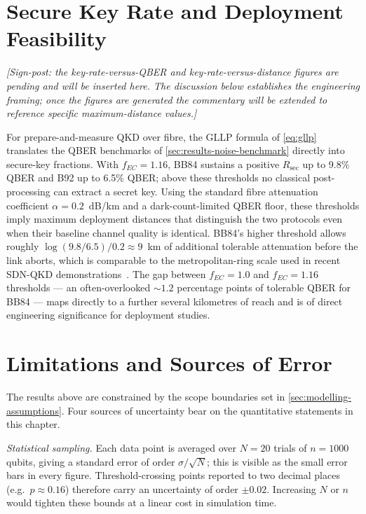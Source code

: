 \documentclass[10pt, a4paper]{report}
\newcommand{\keyrate}{\ensuremath{R_{\mathrm{sec}}}}
\begin{document}
\section{Secure Key Rate and Deployment Feasibility}
\label{sec:results-keyrate}

\textit{[Sign-post: the key-rate-versus-QBER and key-rate-versus-distance figures are pending and will be inserted here. The discussion below establishes the engineering framing; once the figures are generated the commentary will be extended to reference specific maximum-distance values.]}

For prepare-and-measure QKD over fibre, the GLLP formula of \cref{eq:gllp} translates the QBER benchmarks of \cref{sec:results-noise-benchmark} directly into secure-key fractions. With $f_{EC}\!=\!1.16$, BB84 sustains a positive $\keyrate$ up to 9.8\% QBER and B92 up to 6.5\% QBER; above these thresholds no classical post-processing can extract a secret key. Using the standard fibre attenuation coefficient $\alpha\!=\!0.2$~dB/km and a dark-count-limited QBER floor, these thresholds imply maximum deployment distances that distinguish the two protocols even when their baseline channel quality is identical. BB84's higher threshold allows roughly $\log(9.8/6.5)/0.2\!\approx\!9$~km of additional tolerable attenuation before the link aborts, which is comparable to the metropolitan-ring scale used in recent SDN-QKD demonstrations~\cite{Zhang2025}. The gap between $f_{EC}\!=\!1.0$ and $f_{EC}\!=\!1.16$ thresholds --- an often-overlooked $\sim\!1.2$ percentage points of tolerable QBER for BB84 --- maps directly to a further several kilometres of reach and is of direct engineering significance for deployment studies.

\section{Limitations and Sources of Error}
\label{sec:limitations-results}

The results above are constrained by the scope boundaries set in \cref{sec:modelling-assumptions}. Four sources of uncertainty bear on the quantitative statements in this chapter.

\textit{Statistical sampling.} Each data point is averaged over $N\!=\!20$ trials of $n\!=\!1000$ qubits, giving a standard error of order $\sigma/\sqrt{N}$; this is visible as the small error bars in every figure. Threshold-crossing points reported to two decimal places (e.g.\ $p\!\approx\!0.16$) therefore carry an uncertainty of order $\pm 0.02$. Increasing $N$ or $n$ would tighten these bounds at a linear cost in simulation time.
\end{document}
